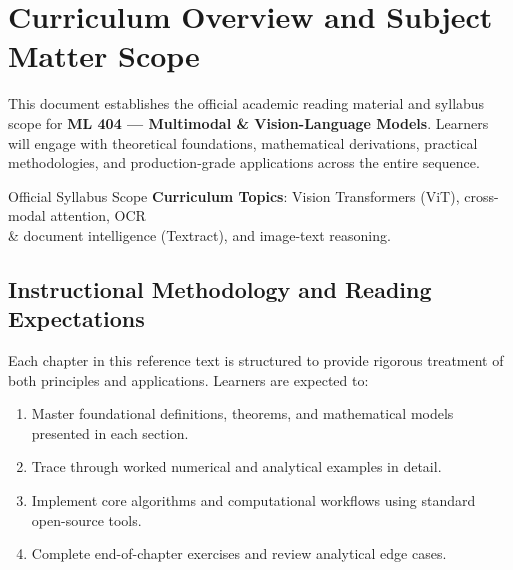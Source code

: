 \section{Curriculum Overview and Subject Matter Scope}

This document establishes the official academic reading material and syllabus scope for \textbf{ML 404 --- Multimodal \& Vision-Language Models}. Learners will engage with theoretical foundations, mathematical derivations, practical methodologies, and production-grade applications across the entire sequence.

\begin{InsightBox}{Official Syllabus Scope}
  \textbf{Curriculum Topics}: Vision Transformers (ViT), cross-modal attention, OCR \\& document intelligence (Textract), and image-text reasoning.
\end{InsightBox}

\subsection{Instructional Methodology and Reading Expectations}

Each chapter in this reference text is structured to provide rigorous treatment of both principles and applications. Learners are expected to:
\begin{enumerate}
  \item Master foundational definitions, theorems, and mathematical models presented in each section.
  \item Trace through worked numerical and analytical examples in detail.
  \item Implement core algorithms and computational workflows using standard open-source tools.
  \item Complete end-of-chapter exercises and review analytical edge cases.
\end{enumerate}


